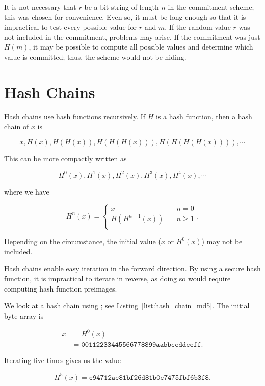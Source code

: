 It is not necessary that $r$ be a bit string of length $n$
in the commitment scheme;
this was chosen for convenience.
Even so, it must be long enough so that it is impractical
to test every possible value for $r$ and $m$.
If the random value $r$ was not included in the commitment,
problems may arise.
If the commitment was just $H(m)$,
it may be possible to compute all possible values
and determine which value is committed;
thus, the scheme would not be hiding.



\section{Hash Chains}

Hash chains use \glspl{hash function} recursively.
If $H$ is a \gls{hash function}, then a hash chain of $x$ is

\begin{equation}
    x, H(x), H(H(x)), H(H(H(x))), H(H(H(H(x)))), \cdots
\end{equation}

\noindent
This can be more compactly written as

\begin{equation}
    H^{0}(x), H^{1}(x), H^{2}(x), H^{3}(x), H^{4}(x), \cdots
\end{equation}

\noindent
where we have

\begin{equation}
    H^{n}(x) = \begin{cases}
            x\quad &n = 0 \\
            H(H^{n-1}(x))\quad &n \ge 1 \\
    \end{cases}.
\end{equation}

\noindent
Depending on the circumstance, the initial value ($x$ or $H^{0}(x)$)
may not be included.

Hash chains enable easy iteration in the forward direction.
By using a secure \gls{hash function}, it is impractical to iterate in reverse,
as doing so would require computing \gls{hash function} preimages.

\begin{example}

We look at a hash chain using \MDFive{};
see Listing~\ref{list:hash_chain_md5}.
The initial byte array is

\begin{align}
    x &= H^{0}(x) \nonumber\\
        &= \texttt{00112233445566778899aabbccddeeff}.
\end{align}



\noindent
Iterating \MDFive{} five times gives us the value

\begin{equation}
    H^{5}(x) = \texttt{e94712ae81bf26d81b0e7475fbf6b3f8}.
\end{equation}
\end{example}


